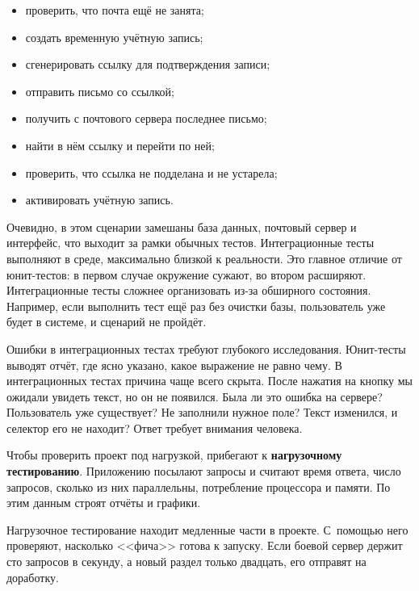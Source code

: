 \begin{itemize}

\item
  проверить, что почта ещё не занята;

\item
  создать временную учётную запись;

\item
  сгенерировать ссылку для подтверждения записи;

\item
  отправить письмо со ссылкой;

\item
  получить с почтового сервера последнее письмо;

\item
  найти в нём ссылку и перейти по ней;

\item
  проверить, что ссылка не подделана и не устарела;

\item
  активировать учётную запись.

\end{itemize}

Очевидно, в этом сценарии замешаны база данных, почтовый сервер и интерфейс, что
выходит за рамки обычных тестов. Интеграционные тесты выполняют в среде,
максимально близкой к реальности. Это главное отличие от юнит-тестов: в первом
случае окружение сужают, во втором расширяют. Интеграционные тесты сложнее
организовать из-за обширного состояния. Например, если выполнить тест ещё раз
без очистки базы, пользователь уже будет в системе, и сценарий не пройдёт.

Ошибки в интеграционных тестах требуют глубокого исследования. Юнит-тесты
выводят отчёт, где ясно указано, какое выражение не равно чему. В интеграционных
тестах причина чаще всего скрыта. После нажатия на кнопку мы ожидали увидеть
текст, но он не появился. Была ли это ошибка на сервере?  Пользователь уже
существует? Не заполнили нужное поле? Текст изменился, и селектор его не
находит? Ответ требует внимания человека.


Чтобы проверить проект под нагрузкой, прибегают к \textbf{нагрузочному тестированию}.
Приложению посылают запросы и считают время ответа, число запросов, сколько
из них параллельны, потребление процессора и памяти. По этим данным строят
отчёты и графики.


Нагрузочное тестирование находит медленные части в проекте. С~помощью него
проверяют, насколько <<фича>> готова к запуску. Если боевой сервер держит сто
запросов в секунду, а новый раздел только двадцать, его отправят на доработку.


